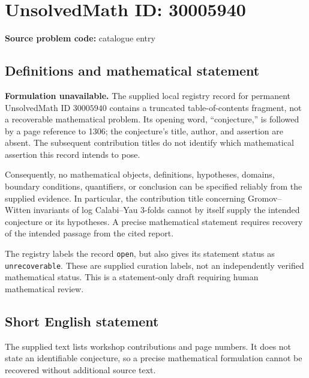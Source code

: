 \documentclass[11pt]{article}
\begin{document}
\section*{UnsolvedMath ID: 30005940}
\textbf{Source problem code:} catalogue entry
\subsection{Definitions and mathematical statement}
\textbf{Formulation unavailable.} The supplied local registry record for permanent UnsolvedMath ID \(30005940\) contains a truncated table-of-contents fragment, not a recoverable mathematical problem. Its opening word, ``conjecture,'' is followed by a page reference to 1306; the conjecture's title, author, and assertion are absent. The subsequent contribution titles do not identify which mathematical assertion this record intends to pose.

Consequently, no mathematical objects, definitions, hypotheses, domains, boundary conditions, quantifiers, or conclusion can be specified reliably from the supplied evidence. In particular, the contribution title concerning Gromov--Witten invariants of log Calabi--Yau \(3\)-folds cannot by itself supply the intended conjecture or its hypotheses. A precise mathematical statement requires recovery of the intended passage from the cited report.

The registry labels the record \texttt{open}, but also gives its statement status as \texttt{unrecoverable}. These are supplied curation labels, not an independently verified mathematical status. This is a statement-only draft requiring human mathematical review.
\subsection{Short English statement}
The supplied text lists workshop contributions and page numbers. It does not state an identifiable conjecture, so a precise mathematical formulation cannot be recovered without additional source text.
\end{document}
